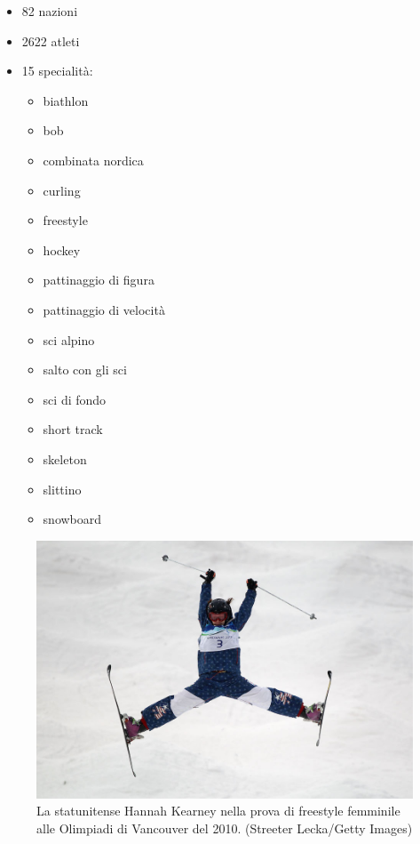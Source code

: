 \documentclass[
]{book}
\providecommand{\tightlist}{%
  \setlength{\itemsep}{0pt}\setlength{\parskip}{0pt}}
\begin{document}
\begin{itemize}
\tightlist
\item
  82 nazioni
\item
  2622 atleti
\item
  15 specialità:

  \begin{itemize}
  \tightlist
  \item
    biathlon
  \item
    bob
  \item
    combinata nordica
  \item
    curling
  \item
    freestyle
  \item
    hockey
  \item
    pattinaggio di figura
  \item
    pattinaggio di velocità
  \item
    sci alpino
  \item
    salto con gli sci
  \item
    sci di fondo
  \item
    short track
  \item
    skeleton
  \item
    slittino
  \item
    snowboard
  \end{itemize}
\end{itemize}

\begin{figure}
\includegraphics[width=0.8\linewidth]{images/IlPost/2010} \caption{La statunitense Hannah Kearney nella prova di freestyle femminile alle Olimpiadi di Vancouver del 2010. (Streeter Lecka/Getty Images)}\label{fig:unnamed-chunk-80}
\end{figure}
\end{document}
